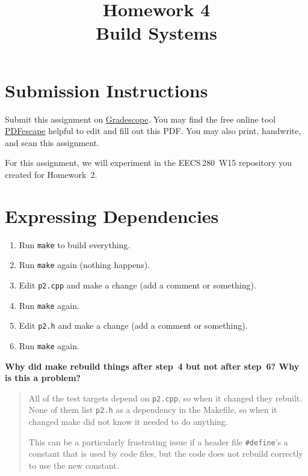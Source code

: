 \documentclass{article}
\begin{document}
\fancyhead[L]{}
\fancyhead[R]{}

\fancyfoot[C]{\color{gray} \thepage~/~\pageref*{LastPage}}
\pagestyle{fancyplain}


\title{\textbf{Homework 4\\Build Systems}}
\author{\textbf{\color{red}{Due: Saturday, October 8, 10:00PM (Hard Deadline)}}}
\date{}
\maketitle

\section*{Submission Instructions}
Submit this assignment on \href{https://gradescope.com/courses/3499}{Gradescope}.
You may find the free online tool \href{https://www.pdfescape.com}{PDFescape}
helpful to edit and fill out this PDF.
You may also print, handwrite, and scan this assignment.



\newpage
\begin{mdframed}\centering
For this assignment, we will experiment in the EECS\,280~W15 repository you
created for Homework~2.
\end{mdframed}

\section{Expressing Dependencies}
\begin{enumerate}\small
  \item Run \texttt{make} to build everything.
  \item Run \texttt{make} again (nothing happens).
  \item Edit \texttt{p2.cpp} and make a change (add a comment or something).
  \item Run \texttt{make} again.
  \item Edit \texttt{p2.h} and make a change (add a comment or something).
  \item Run \texttt{make} again.
\end{enumerate}

\textbf{Why did make rebuild things after step~4 but not after step~6? Why is
this a problem?}
\begin{quote}
  \color{violet}
  All of the test targets depend on \texttt{p2.cpp}, so when it changed they
  rebuilt. None of them list \texttt{p2.h} as a dependency in the Makefile, so
  when it changed make did not know it needed to do anything.

  This can be a particularly frustrating issue if a header file
  \texttt{\#define}'s a constant that is used by code files, but the code does
  not rebuild correctly to use the new constant.
\end{quote}
\end{document}
